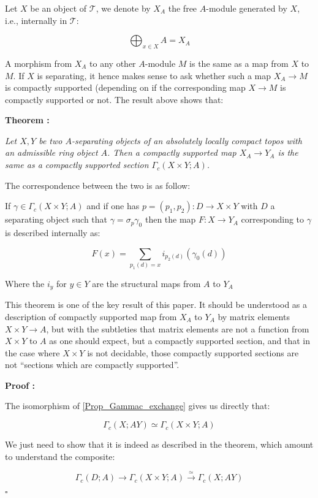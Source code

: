 \documentclass[a4paper]{article}
\newcommand{\Tcal}{\mathcal{T}}
\newcommand{\block}[1]
{

\par \subsubsection{} #1

\bigskip}
\newcommand{\Th}[1]
	{
	\bigskip	
	\textbf{Theorem : }{\itshape #1}
		
	\bigskip
	}
\newcommand{\Dem}[1]{
	
	\smallskip
	
	\textbf{Proof : } \par
	 {#1} $\square$
	 
	 \bigskip
}
\begin{document}
\block{\label{Prop_MatrixRep}Let $X$ be an object of $\Tcal$, we denote by $X_A$ the free $A$-module generated by $X$, i.e., internally in $\Tcal$:

\[ \bigoplus_{x \in X} A =X_A \]

A morphism from $X_A$ to any other $A$-module $M$ is the same as a map from $X$ to $M$. If $X$ is separating, it hence makes sense to ask whether such a map $X_A \rightarrow M$ is compactly supported (depending on if the corresponding map $X \rightarrow M$ is compactly supported or not. The result above shows that:


\Th{Let $X,Y$ be two $A$-separating objects of an absolutely locally compact topos with an admissible ring object $A$. Then a compactly supported map $X_A \rightarrow Y_A$ is the same as a compactly supported section $\Gamma_c(X \times Y; A)$.

\bigskip

The correspondence between the two is as follow:


\bigskip

If $\gamma \in \Gamma_c(X \times Y;A)$ and if one has $p=(p_1,p_2):D \rightarrow X \times Y$ with $D$ a separating object such that $\gamma = \sigma_p \gamma_0$ then the map $F: X \rightarrow Y_A$ corresponding to $\gamma$ is described internally as:

\[ F(x) = \sum_{p_1(d)=x} i_{p_2(d)}(\gamma_0(d)) \]

Where the $i_y$ for $y \in Y$ are the structural maps from $A$ to $Y_A$ 

}

This theorem is one of the key result of this paper. It should be understood as a description of compactly supported map from $X_A$ to $Y_A$ by matrix elements $X \times Y \rightarrow A$, but with the subtleties that matrix elements are not a function from $X \times Y$ to $A$ as one should expect, but a compactly supported section, and that in the case where $X \times Y$ is not decidable, those compactly supported sections are not ``sections which are compactly supported''.

\Dem{The isomorphism of \ref{Prop_Gammac_exchange} gives us directly that:

\[ \Gamma_c( X;A Y) \simeq \Gamma_c(X \times Y; A) \]

We just need to show that it is indeed as described in the theorem, which amount to understand the composite:


\[ \Gamma_c(D;A) \rightarrow \Gamma_c(X \times Y;A) \overset{\simeq}{\rightarrow} \Gamma_c(X;A Y) \]

}}
\end{document}

